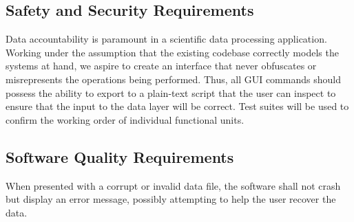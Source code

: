 \documentclass{article}
\begin{document}
\subsection{Safety and Security Requirements}
Data accountability is paramount in a scientific data processing application. Working under the assumption that the existing codebase correctly models the systems at hand, we aspire to create an interface that never obfuscates or misrepresents the operations being performed. Thus, all GUI commands should possess the ability to export to a plain-text script that the user can inspect to ensure that the input to the data layer will be correct. Test suites will be used to confirm the working order of individual functional units.

\subsection{Software Quality Requirements}

When presented with a corrupt or invalid data file, the software shall not crash but display an error message, possibly attempting to help the user recover the data.
\end{document}
